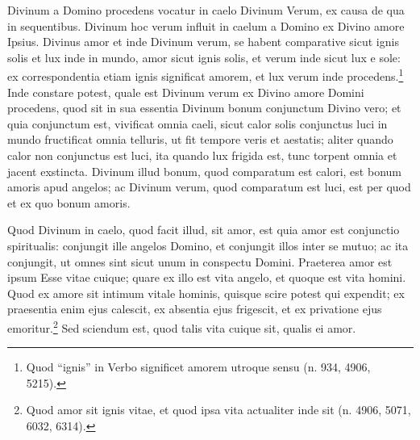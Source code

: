 
\begin{topic}{13}
    Divinum a Domino procedens vocatur in caelo Divinum Verum, ex causa de qua in sequentibus.
    Divinum hoc verum influit in caelum a Domino ex Divino amore Ipsius.
    Divinus amor et inde Divinum verum, se habent comparative sicut ignis solis et lux inde in mundo, amor sicut ignis
    solis, et verum inde sicut lux e sole: ex correspondentia etiam ignis significat amorem, et lux verum inde
    procedens.\footnote{Quod ``ignis'' in Verbo significet amorem utroque sensu (n. 934, 4906, 5215).}
    Inde constare potest, quale est Divinum verum ex Divino amore Domini procedens, quod sit in sua essentia Divinum
    bonum conjunctum Divino vero; et quia conjunctum est, vivificat omnia caeli, sicut calor solis conjunctus luci in
    mundo fructificat omnia telluris, ut fit tempore veris et aestatis; aliter quando calor non conjunctus est luci, ita
    quando lux frigida est, tunc torpent omnia et jacent exstincta.
    Divinum illud bonum, quod comparatum est calori, est bonum amoris apud angelos; ac Divinum verum, quod comparatum
    est luci, est per quod et ex quo bonum amoris.
\end{topic}

\begin{topic}{14}
    Quod Divinum in caelo, quod facit illud, sit amor, est quia amor est conjunctio spiritualis: conjungit ille angelos
    Domino, et conjungit illos inter se mutuo; ac ita conjungit, ut omnes sint sicut unum in conspectu Domini.
    Praeterea amor est ipsum Esse vitae cuique; quare ex illo est vita angelo, et quoque est vita homini.
    Quod ex amore sit intimum vitale hominis, quisque scire potest qui expendit; ex praesentia enim ejus calescit, ex
    absentia ejus frigescit, et ex privatione ejus emoritur.\footnote{Quod amor sit ignis vitae, et quod ipsa vita
    actualiter inde sit (n. 4906, 5071, 6032, 6314).}
    Sed sciendum est, quod talis vita cuique sit, qualis ei amor.
\end{topic}

